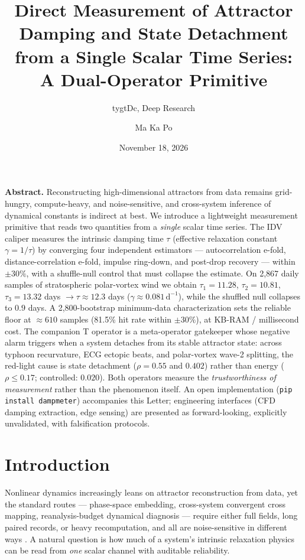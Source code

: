 \documentclass[10pt,twocolumn]{article}
\title{\bfseries Direct Measurement of Attractor Damping and State Detachment\\from a Single Scalar Time Series: A Dual-Operator Primitive}
\author{tygtDc, Deep Research \and Ma Ka Po}
\date{November 18, 2026}
\begin{document}
\maketitle

\textbf{Abstract.}
Reconstructing high-dimensional attractors from data remains grid-hungry,
compute-heavy, and noise-sensitive, and cross-system inference of dynamical
constants is indirect at best. We introduce a lightweight measurement
primitive that reads two quantities from a \emph{single} scalar time series.
The IDV caliper measures the intrinsic damping time $\tau$ (effective
relaxation constant $\gamma = 1/\tau$) by converging four independent
estimators --- autocorrelation e-fold, distance-correlation e-fold, impulse
ring-down, and post-drop recovery --- within $\pm 30\%$, with a shuffle-null
control that must collapse the estimate. On 2,867 daily samples of
stratospheric polar-vortex wind we obtain $\tau_1 = 11.28$, $\tau_2 = 10.81$,
$\tau_3 = 13.32$ days $\rightarrow \tau \approx 12.3$ days
($\gamma \approx 0.081\,\mathrm{d}^{-1}$), while the shuffled null collapses
to $0.9$ days. A 2{,}800-bootstrap minimum-data characterization sets the
reliable floor at $\approx 610$ samples (81.5\% hit rate within $\pm 30\%$),
at KB-RAM / millisecond cost. The companion T operator is a meta-operator
gatekeeper whose negative alarm triggers when a system detaches from its
stable attractor state: across typhoon recurvature, ECG ectopic beats, and
polar-vortex wave-2 splitting, the red-light cause is state detachment
($\rho = 0.55$ and $0.402$) rather than energy ($\rho \le 0.17$; controlled:
$0.020$). Both operators measure the \emph{trustworthiness of measurement}
rather than the phenomenon itself. An open implementation
(\texttt{pip install dampmeter}) accompanies this Letter; engineering
interfaces (CFD damping extraction, edge sensing) are presented as
forward-looking, explicitly unvalidated, with falsification protocols.

\section{Introduction}

Nonlinear dynamics increasingly leans on attractor reconstruction from
data, yet the standard routes --- phase-space embedding, cross-system
convergent cross mapping, reanalysis-budget dynamical diagnosis --- require
either full fields, long paired records, or heavy recomputation, and all are
noise-sensitive in different ways \cite{Takens,Sugihara}. A natural question
is how much of a system's intrinsic relaxation physics can be read from
\emph{one} scalar channel with auditable reliability.
\end{document}
